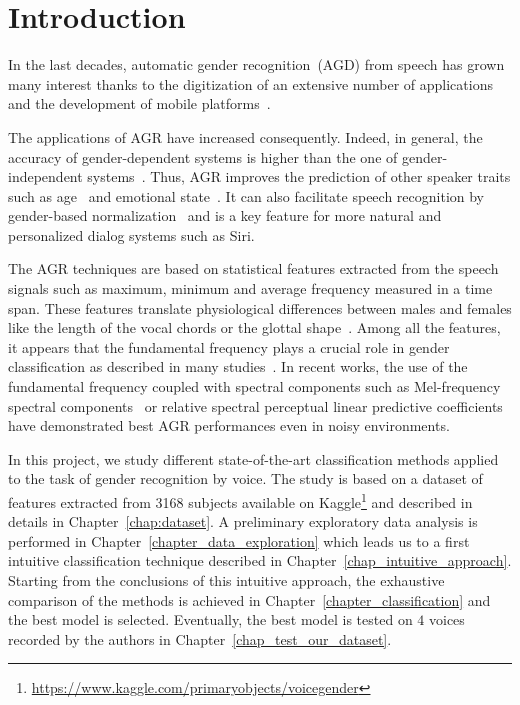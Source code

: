 

\chapter{Introduction}
\label{chap:introduction}

In the last decades, automatic gender recognition~(AGD) from speech has grown many interest thanks to the digitization of an extensive number of applications and the development of mobile platforms~\cite{Wu_JASA_1991, Wu_JASA_1991_2, Childers_ICASSP_1988, Harb2005, Zeng2006, Sorokin2008, Metze_ICASSP_2007, Bocklet_ICASSP_2008}.

The applications of AGR have increased consequently. Indeed, in general, the accuracy of gender-dependent systems is higher than the one of gender-independent systems~\cite{Harb2005}. Thus, AGR improves the prediction of other speaker traits such as age~\cite{Levi2015} and emotional state~\cite{Bisio2013, Ververidis2004}. It can also facilitate speech recognition by gender-based normalization~\cite{Wegmann_ICASSP_1996} and is a key feature for more natural and personalized dialog systems such as Siri.

The AGR techniques are based on statistical features extracted from the speech signals such as maximum, minimum and average frequency measured in a time span. These features translate physiological differences between males and females like the length of the vocal chords or the glottal shape~\cite{Titze_JASA_1989}. Among all the features, it appears that the fundamental frequency plays a crucial role in gender classification as described in many studies~\cite{Hollien1967, Wu_JASA_1991, Poon2015}. In recent works, the use of the fundamental frequency coupled with spectral components such as Mel-frequency spectral components~\cite{Gupta2016} or relative spectral perceptual linear predictive coefficients~\cite{Zeng2006} have demonstrated best AGR performances even in noisy environments.

In this project, we study different state-of-the-art classification methods applied to the task of gender recognition by voice. The study is based on a dataset of features extracted from \num{3168} subjects available on Kaggle\footnote{\url{https://www.kaggle.com/primaryobjects/voicegender}} and described in details in Chapter~\ref{chap:dataset}. A preliminary exploratory data analysis is performed in Chapter~\ref{chapter_data_exploration} which leads us to a first intuitive classification technique described in Chapter~\ref{chap_intuitive_approach}. Starting from the conclusions of this intuitive approach, the exhaustive comparison of the methods is achieved in Chapter~\ref{chapter_classification} and the best model is selected. Eventually, the best model is tested on $\num{4}$ voices recorded by the authors in Chapter~\ref{chap_test_our_dataset}.
  